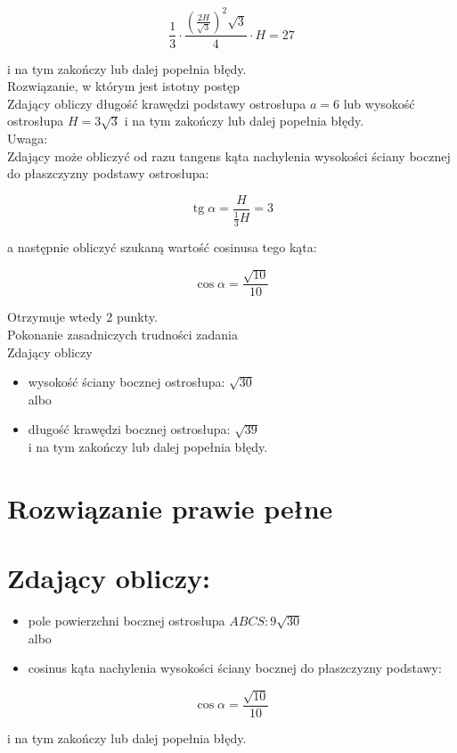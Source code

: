 \documentclass[10pt]{article}
\begin{document}
$$
\frac{1}{3} \cdot \frac{\left(\frac{2 H}{\sqrt{3}}\right)^{2} \sqrt{3}}{4} \cdot H=27
$$

i na tym zakończy lub dalej popełnia błędy.\\
Rozwiązanie, w którym jest istotny postęp\\
Zdający obliczy długość krawędzi podstawy ostrosłupa $a=6$ lub wysokość ostrosłupa $H=3 \sqrt{3}$ i na tym zakończy lub dalej popełnia błędy.\\
Uwaga:\\
Zdający może obliczyć od razu tangens kąta nachylenia wysokości ściany bocznej do płaszczyzny podstawy ostrosłupa:

$$
\operatorname{tg} \alpha=\frac{H}{\frac{1}{3} H}=3
$$

a następnie obliczyć szukaną wartość cosinusa tego kąta:

$$
\cos \alpha=\frac{\sqrt{10}}{10}
$$

Otrzymuje wtedy 2 punkty.\\
Pokonanie zasadniczych trudności zadania\\
Zdający obliczy

\begin{itemize}
  \item wysokość ściany bocznej ostrosłupa: $\sqrt{30}$\\
albo
  \item długość krawędzi bocznej ostrosłupa: $\sqrt{39}$\\
i na tym zakończy lub dalej popełnia błędy.
\end{itemize}

\section*{Rozwiązanie prawie pełne}
\section*{Zdający obliczy:}
\begin{itemize}
  \item pole powierzchni bocznej ostrosłupa $A B C S: 9 \sqrt{30}$\\
albo
  \item cosinus kąta nachylenia wysokości ściany bocznej do płaszczyzny podstawy:
\end{itemize}

$$
\cos \alpha=\frac{\sqrt{10}}{10}
$$

i na tym zakończy lub dalej popełnia błędy.
\end{document}
